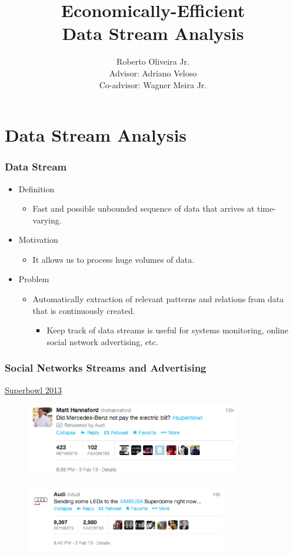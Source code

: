 \documentclass[14pt]{beamer}
\title{Economically-Efficient\\Data Stream Analysis}
\author{\small{Roberto Oliveira Jr.\\Advisor: Adriano Veloso \\Co-advisor: Wagner Meira Jr.}}
\institute{Computer Science Dept - UFMG - Brazil}
\date{}
\begin{document}
\begin{frame}
\titlepage
\end{frame}

\section{Data Stream Analysis}

\begin{frame}\frametitle{Data Stream}

\begin{itemize}
\item Definition
\begin{itemize}
\item Fast and possible unbounded sequence of data that arrives at time-varying.
\end{itemize}
\item Motivation
\begin{itemize}
\item It allows us to process huge volumes of data.
\end{itemize}
\end{itemize}
\begin{itemize}
\item Problem
\begin{itemize}
\item Automatically extraction of relevant patterns and relations from data that is continuously created.
\begin{itemize}
\item Keep track of data streams is useful for systems monitoring, online social network advertising, etc.
\end{itemize}
\end{itemize}
\end{itemize}

\end{frame}

\begin{frame}\frametitle{Social Networks Streams and Advertising}

{\underline{Superbowl 2013}}

\begin{figure}
\centering
\includegraphics[height=1.30in]{mercedez}
\end{figure}
\vspace{-0.1in}
\begin{figure}
\centering
\includegraphics[height=1.10in]{audi}
\end{figure}

\end{frame}
\end{document}

